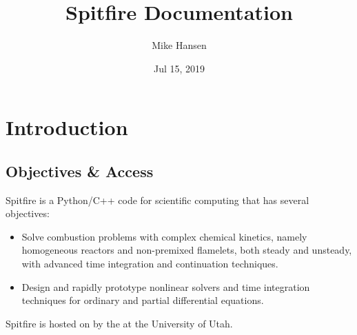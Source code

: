 \documentclass[letterpaper,10pt,english]{sphinxmanual}
\title{Spitfire Documentation}
\date{Jul 15, 2019}
\author{Mike Hansen}
\begin{document}
\pagestyle{empty}
\sphinxmaketitle
\pagestyle{plain}
\sphinxtableofcontents
\pagestyle{normal}
\label{\detokenize{index::doc}}




\chapter{Introduction}
\label{\detokenize{introduction:introduction}}\label{\detokenize{introduction::doc}}

\section{Objectives \& Access}
\label{\detokenize{introduction:objectives-access}}
Spitfire is a Python/C++ code for scientific computing that has several objectives:
\begin{itemize}
\item {} 
Solve combustion problems with complex chemical kinetics, namely homogeneous reactors and non-premixed flamelets, both steady and unsteady, with advanced time integration and continuation techniques.

\item {} 
Design and rapidly prototype nonlinear solvers and time integration techniques for ordinary and partial differential equations.

\end{itemize}

Spitfire is hosted on  by the  at the University of Utah.
\end{document}
